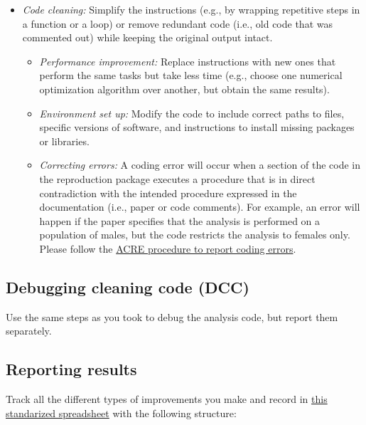 \documentclass[]{book}
\providecommand{\tightlist}{%
  \setlength{\itemsep}{0pt}\setlength{\parskip}{0pt}}
\begin{document}
\begin{itemize}
\tightlist
\item
  \emph{Code cleaning:} Simplify the instructions (e.g., by wrapping repetitive steps in a function or a loop) or remove redundant code (i.e., old code that was commented out) while keeping the original output intact.

  \begin{itemize}
  \tightlist
  \item
    \emph{Performance improvement:} Replace instructions with new ones that perform the same tasks but take less time (e.g., choose one numerical optimization algorithm over another, but obtain the same results).\\
  \item
    \emph{Environment set up:} Modify the code to include correct paths to files, specific versions of software, and instructions to install missing packages or libraries.\\
  \item
    \emph{Correcting errors:} A coding error will occur when a section of the code in the reproduction package executes a procedure that is in direct contradiction with the intended procedure expressed in the documentation (i.e., paper or code comments). For example, an error will happen if the paper specifies that the analysis is performed on a population of males, but the code restricts the analysis to females only. Please follow the \href{ADD\%20LINK}{ACRE procedure to report coding errors}.
  \end{itemize}
\end{itemize}

\hypertarget{debugging-cleaning-code-dcc}{%
\subsection{Debugging cleaning code (DCC)}\label{debugging-cleaning-code-dcc}}

Use the same steps as you took to debug the analysis code, but report them separately.

\hypertarget{reporting-results}{%
\subsection{Reporting results}\label{reporting-results}}

Track all the different types of improvements you make and record in \href{https://docs.google.com/spreadsheets/d/1LUIdVFH0OfR70C7z07TYeE-uWzKI_JIeWUMaYhqEKK0/edit\#gid=0\&range=A3}{this standarized spreadsheet} with the following structure:
\end{document}
